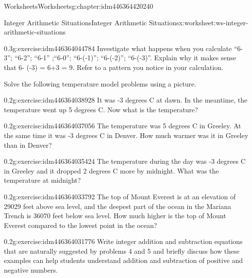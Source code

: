 \documentclass[twoside,11pt,]{book}
\begin{document}
\begin{chapterptx}{Worksheets}{}{Worksheets}{}{}{g:chapter:idm446364420240}
\begin{worksheet-section-numberless}{Integer Arithmetic Situations}{}{Integer Arithmetic Situations}{}{}{x:worksheet:ws-integer-arithmetic-situations}
\begin{introduction}{}
\end{introduction}%
\begin{divisionexercise}{1}{}{0.3}{g:exercise:idm446364044784}%
Investigate what happens when you calculate ``6-3'';  ``6-2'';  ``6-1'' ;``6-0''; ``6-(-1)'';     ``6-(-2)''; ``6-(-3)''.  Explain why it makes sense that 6- (-3) = 6+3 = 9.   Refer to a pattern you notice in your calculation.%
\end{divisionexercise}%
\begin{introduction}{}%
Solve the following temperature model problems using a picture.%
\end{introduction}%
\begin{divisionexercise}{2}{}{0.2}{g:exercise:idm446364038928}%
It was -3 degrees C at dawn. In the meantime, the temperature went up 5 degrees C. Now what is the temperature?%
\end{divisionexercise}%
\clearpage
\begin{divisionexercise}{3}{}{0.2}{g:exercise:idm446364037056}%
The temperature was 5 degrees C in Greeley. At the same time it was -3 degrees C in Denver. How much warmer was it in Greeley than in Denver?%
\end{divisionexercise}%
\begin{divisionexercise}{4}{}{0.2}{g:exercise:idm446364035424}%
The temperature during the day was -3 degrees C in Greeley and it dropped 2 degrees C more by midnight. What was the temperature at midnight?%
\end{divisionexercise}%
\begin{divisionexercise}{5}{}{0.2}{g:exercise:idm446364033792}%
The top of Mount Everest is at an elevation of 29029 feet above sea level, and the deepest part of the ocean in the Mariana Trench is 36070 feet below sea level.  How much higher is the top of Mount Everest compared to the lowest point in the ocean?%
\end{divisionexercise}%
\clearpage
\begin{divisionexercise}{6}{}{0.2}{g:exercise:idm446364031776}%
Write integer addition and subtraction equations that are naturally suggested by problems 4 and 5 and briefly discuss how these examples can help students understand addition and subtraction of positive and negative numbers.%
\end{divisionexercise}%
\end{worksheet-section-numberless}
\restoregeometry
%
%
\typeout{************************************************}
\typeout{************************************************}

\end{chapterptx}
\end{document}
